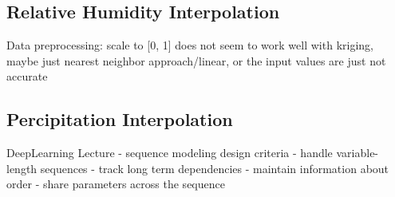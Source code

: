 \subsection{Relative Humidity Interpolation}
Data preprocessing: scale to [0, 1]
does not seem to work well with kriging, maybe just nearest neighbor approach/linear, or the input values are just not accurate

\subsection{Percipitation Interpolation}



DeepLearning Lecture
- sequence modeling design criteria
    - handle variable-length sequences
    - track long term dependencies
    - maintain information about order
    - share parameters across the sequence


